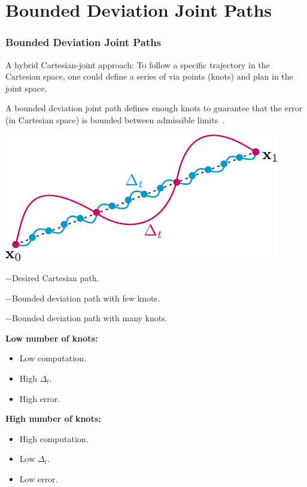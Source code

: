 \documentclass[10pt, aspectratio=169]{beamer}
\theoremstyle{remark}
\theoremstyle{definition}
\begin{document}
\section{Bounded Deviation Joint Paths}
\begin{frame}[allowframebreaks]
\frametitle{Bounded Deviation Joint Paths}

A hybrid Cartesian-joint approach: To follow a specific trajectory in the Cartesian space, one could define a series of via points (knots) and plan in the joint space.

A bounded deviation joint path defines enough knots to guarantee that the error (in Cartesian space) is bounded between admissible limits~\cite{taylor1979planning}.

 \begin{center}
    \begin{minipage}{.5\linewidth}
    \includegraphics[width = 0.9\textwidth]{images/bounded_joint_path.pdf}
    
    $-$Desired Cartesian path.
    
    \textcolor{uma_pink}{$-$Bounded deviation path with few knots.}
    
    \textcolor{uma_blue_light}{$-$Bounded deviation path with many knots.}
    \end{minipage}%
    \hspace{0.5cm}
    \begin{minipage}{.45\linewidth}
    \textcolor{uma_pink}{\textbf{Low number of knots:}}
        \begin{itemize}
            \item Low computation.
            \item High $\Delta_t$.
            \item High error.
        \end{itemize}
    \textcolor{uma_blue_light}{\textbf{High number of knots:}}
    \begin{itemize}
        \item High computation.
        \item Low $\Delta_t$.
        \item Low error.
    \end{itemize}
    \end{minipage}
    \end{center}


\end{frame}
\end{document}
